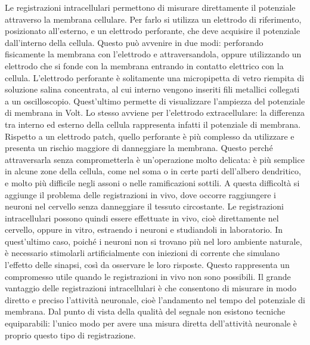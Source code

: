Le registrazioni intracellulari permettono di misurare direttamente il potenziale attraverso la membrana cellulare. Per farlo si utilizza un elettrodo di riferimento, posizionato all’esterno, e un elettrodo perforante, che deve acquisire il potenziale dall’interno della cellula. Questo può avvenire in due modi: perforando fisicamente la membrana con l’elettrodo e attraversandola, oppure utilizzando un elettrodo che si fonde con la membrana entrando in contatto elettrico con la cellula. L’elettrodo perforante è solitamente una micropipetta di vetro riempita di soluzione salina concentrata, al cui interno vengono inseriti fili metallici collegati a un oscilloscopio. Quest’ultimo permette di visualizzare l’ampiezza del potenziale di membrana in Volt. Lo stesso avviene per l’elettrodo extracellulare: la differenza tra interno ed esterno della cellula rappresenta infatti il potenziale di membrana. Rispetto a un elettrodo patch, quello perforante è più complesso da utilizzare e presenta un rischio maggiore di danneggiare la membrana. Questo perché attraversarla senza comprometterla è un’operazione molto delicata: è più semplice in alcune zone della cellula, come nel soma o in certe parti dell’albero dendritico, e molto più difficile negli assoni o nelle ramificazioni sottili. A questa difficoltà si aggiunge il problema delle registrazioni in vivo, dove occorre raggiungere i neuroni nel cervello senza danneggiare il tessuto circostante. Le registrazioni intracellulari possono quindi essere effettuate in vivo, cioè direttamente nel cervello, oppure in vitro, estraendo i neuroni e studiandoli in laboratorio. In quest’ultimo caso, poiché i neuroni non si trovano più nel loro ambiente naturale, è necessario stimolarli artificialmente con iniezioni di corrente che simulano l’effetto delle sinapsi, così da osservare le loro risposte. Questo rappresenta un compromesso utile quando le registrazioni in vivo non sono possibili.
Il grande vantaggio delle registrazioni intracellulari è che consentono di misurare in modo diretto e preciso l’attività neuronale, cioè l’andamento nel tempo del potenziale di membrana. Dal punto di vista della qualità del segnale non esistono tecniche equiparabili: l’unico modo per avere una misura diretta dell’attività neuronale è proprio questo tipo di registrazione.

